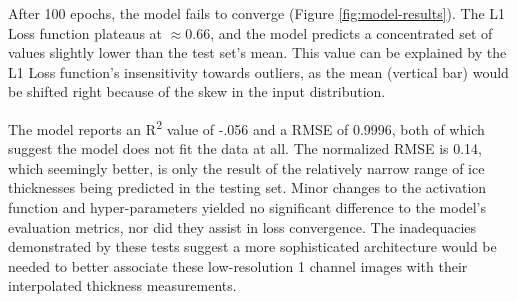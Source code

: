 After 100 epochs, the model fails to converge (Figure \ref{fig:model-results}). The L1 Loss function plateaus at $\approx0.66$, and the model predicts a concentrated set of values slightly lower than the test set's mean. This value can be explained by the L1 Loss function's insensitivity towards outliers, as the mean (vertical bar) would be shifted right because of the skew in the input distribution.

The model reports an R\textsuperscript{2} value of -.056 and a RMSE of 0.9996, both of which suggest the model does not fit the data at all. The normalized RMSE is 0.14, which seemingly better, is only the result of the relatively narrow range of ice thicknesses being predicted in the testing set. Minor changes to the activation function and hyper-parameters yielded no significant difference to the model's evaluation metrics, nor did they assist in loss convergence. The inadequacies demonstrated by these tests suggest a more sophisticated architecture would be needed to better associate these low-resolution 1 channel images with their interpolated thickness measurements.

